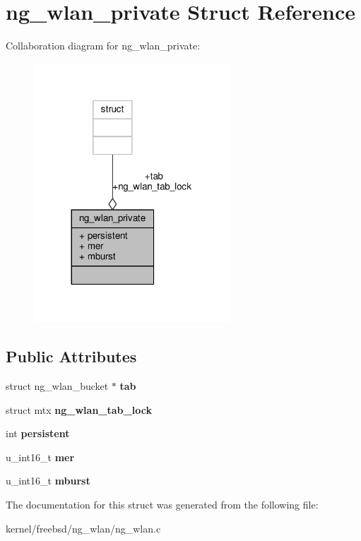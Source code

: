 \hypertarget{structng__wlan__private}{\section{ng\+\_\+wlan\+\_\+private Struct Reference}
\label{structng__wlan__private}
}


Collaboration diagram for ng\+\_\+wlan\+\_\+private\+:
\nopagebreak
\begin{figure}[H]
\begin{center}
\leavevmode
\includegraphics[width=209pt]{structng__wlan__private__coll__graph}
\end{center}
\end{figure}
\subsection*{Public Attributes}
\begin{DoxyCompactItemize}
\item 
\hypertarget{structng__wlan__private_a3f95d1d23c3e60f49f0d7b2ff75b08d4}{struct ng\+\_\+wlan\+\_\+bucket $\ast$ {\bfseries tab}}\label{structng__wlan__private_a3f95d1d23c3e60f49f0d7b2ff75b08d4}

\item 
\hypertarget{structng__wlan__private_a331090a7b215a47465382140bb7f68c5}{struct mtx {\bfseries ng\+\_\+wlan\+\_\+tab\+\_\+lock}}\label{structng__wlan__private_a331090a7b215a47465382140bb7f68c5}

\item 
\hypertarget{structng__wlan__private_a249b323de88fecd3cfc6a2a2587fbe01}{int {\bfseries persistent}}\label{structng__wlan__private_a249b323de88fecd3cfc6a2a2587fbe01}

\item 
\hypertarget{structng__wlan__private_ab3dd3e070fbffe341a7af473edaa014d}{u\+\_\+int16\+\_\+t {\bfseries mer}}\label{structng__wlan__private_ab3dd3e070fbffe341a7af473edaa014d}

\item 
\hypertarget{structng__wlan__private_ae44a9552ce9439815bcff289e6571a13}{u\+\_\+int16\+\_\+t {\bfseries mburst}}\label{structng__wlan__private_ae44a9552ce9439815bcff289e6571a13}

\end{DoxyCompactItemize}


The documentation for this struct was generated from the following file\+:\begin{DoxyCompactItemize}
\item 
kernel/freebsd/ng\+\_\+wlan/ng\+\_\+wlan.\+c\end{DoxyCompactItemize}
